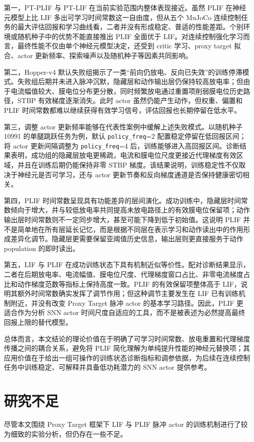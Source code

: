 \documentclass[UTF8,zihao=-4,oneside,openany]{ctexbook}
\begin{document}
第一，PT-PLIF 与 PT-LIF 在当前实验范围内整体表现接近。虽然 PLIF 在神经元模型上比 LIF 多出可学习时间常数这一自由度，但从五个 MuJoCo 连续控制任务的最大评估回报和学习曲线看，二者并没有形成稳定、普适的性能差距。个别环境或随机种子中的优势不能直接推出 PLIF 全面优于 LIF。对连续控制强化学习而言，最终性能不仅由单个神经元模型决定，还受到 critic 学习、proxy target 拟合、actor 更新频率、探索噪声以及随机种子等因素共同影响。

第二，Hopper-v4 默认失败组揭示了一类“前向仍放电、反向已失效”的训练停滞模式。失败组后期并未进入脉冲沉默，隐藏层和动作输出层仍保持较高放电率；但由于电流幅值较大、膜电位分布更分散，同时频繁放电通过重置项削弱膜电位历史路径，STBP 有效梯度逐渐消失。此时 actor 虽然仍能产生动作，但权重、偏置和 PLIF 时间常数都难以继续获得有效学习信号，评估回报也长期停留在低水平。

第三，调整 actor 更新频率能够在代表性案例中缓解上述失败模式。以随机种子 10991 的单腿跳跃任务为例，默认 \texttt{policy\_freq}=2 配置稳定停留在低回报区间；将 actor 更新间隔调整为 \texttt{policy\_freq}=4 后，训练能够进入高回报区间。诊断结果表明，成功组的隐藏层放电更稀疏，电流和膜电位尺度更接近代理梯度有效区域，并且在训练后期仍能保持非零 STBP 梯度。该结果说明，训练稳定性不仅取决于神经元是否可学习，还与 actor 更新节奏和反向梯度通道是否保持健康密切相关。

第四，PLIF 时间常数呈现具有功能差异的层间演化。成功训练中，隐藏层时间常数倾向于增大，并与较低放电率共同提高未放电路径上的有效膜电位保留项；动作输出层时间常数则不一定同步增大，甚至可能下降到低于初始值。这说明 PLIF 并不是简单地在所有层延长记忆，而是根据不同层在表示学习和动作读出中的作用形成差异化调节。隐藏层更需要保留亚阈值历史信息，输出层则更直接服务于动作 population 的即时读出。

第五，LIF 与 PLIF 在成功训练状态下具有机制近似等价性。配对诊断结果显示，二者在后期放电率、电流幅值、膜电位尺度、代理梯度窗口占比、非零电流梯度占比和动作梯度范数等指标上保持高度一致。PLIF 的有效保留项整体高于 LIF，说明其额外时间常数确实发挥了调节作用；但这种调节主要发生在 LIF 已有训练机制附近，并没有改变 Proxy Target 脉冲 actor 的基本学习路径。因此，PLIF 更适合作为分析 SNN actor 时间尺度自适应的工具，而不是被表述为必然提高最终回报上限的替代模型。

总体而言，本文结论的理论价值在于明确了可学习时间常数、放电重置和代理梯度传播之间的耦合关系，避免将 PLIF 简化理解为单纯提升性能的神经元替换项；其应用价值在于给出一组可操作的训练状态诊断指标和调参依据，为后续在连续控制任务中训练稳定、可解释并具备低功耗潜力的 SNN actor 提供参考。

\section{研究不足}
尽管本文围绕 Proxy Target 框架下 LIF 与 PLIF 脉冲 actor 的训练机制进行了较为细致的实验分析，但仍存在一些不足。
\end{document}
